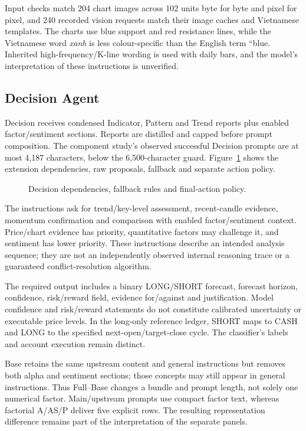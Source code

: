 Input checks match 204 chart images across 102 units byte for byte and pixel for pixel, and 240 recorded vision requests match their image caches and Vietnamese templates. The charts use blue support and red resistance lines, while the Vietnamese word \emph{xanh} is less colour-specific than the English term ``blue. Inherited high-frequency/K-line wording is used with daily bars, and the model's interpretation of these instructions is unverified.

\subsection{Decision Agent}
Decision receives condensed Indicator, Pattern and Trend reports plus enabled factor/sentiment sections. Reports are distilled and capped before prompt composition. The component study's observed successful Decision prompts are at most 4,187 characters, below the 6,500-character guard. Figure~\ref{fig:decision_agent} shows the extension dependencies, raw proposals, fallback and separate action policy.

\begin{figure}[htb]
\centering
\caption{Decision dependencies, fallback rules and final-action policy.}
\label{fig:decision_agent}
\end{figure}

The instructions ask for trend/key-level assessment, recent-candle evidence, momentum confirmation and comparison with enabled factor/sentiment context. Price/chart evidence has priority, quantitative factors may challenge it, and sentiment has lower priority. These instructions describe an intended analysis sequence; they are not an independently observed internal reasoning trace or a guaranteed conflict-resolution algorithm.

The required output includes a binary LONG/SHORT forecast, forecast horizon, confidence, risk/reward field, evidence for/against and justification. Model confidence and risk/reward statements do not constitute calibrated uncertainty or executable price levels. In the long-only reference ledger, SHORT maps to CASH and LONG to the specified next-open/target-close cycle. The classifier's labels and account execution remain distinct.

Base retains the same upstream content and general instructions but removes both alpha and sentiment sections; those concepts may still appear in general instructions. Thus Full--Base changes a bundle and prompt length, not solely one numerical factor. Main/upstream prompts use compact factor text, whereas factorial A/AS/P deliver five explicit rows. The resulting representation difference remains part of the interpretation of the separate panels.

